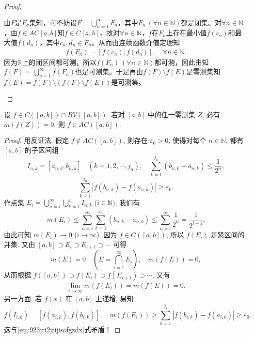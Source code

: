 \documentclass[../../main.tex]{subfiles}%
\begin{document}
\begin{proof}
\begin{enumerate}[(1)]
由$F$是$F_{\sigma}$集知，可不妨设$F=\bigcup\limits_{n=1}^{\infty}F_n$，其中$F_n\ (\forall n\in \mathbb{N})$都是闭集。对$\forall n\in \mathbb{N}$，由$f\in AC[a,b]$知$f\in C[a,b]$，故对$\forall n\in \mathbb{N}$，$f$在$F_n$上存在最小值$f(c_n)$和最大值$f(d_n)$，其中$c_n,d_n\in F_n$。从而由连续函数介值定理知
\begin{align*}
f(F_n)=\left[ f(c_n),f(d_n) \right],\quad \forall n\in \mathbb{N}.
\end{align*}
因为$\mathbb{R}$上的闭区间都可测，所以$f(F_n)\ (\forall n\in \mathbb{N})$都可测，因此由知$f(F)=\bigcup\limits_{n=1}^{\infty}f(F_n)$也是可测集。于是再由$f(F)\setminus f(E)$是零测集知$f(E)=f(F)\setminus (f(F)\setminus f(E))$是可测集。
\end{enumerate}
\end{proof}

\begin{example}
设 $f\in C([a,b])\cap  BV([a,b])$. 若对 $[a,b]$ 中的任一零测集 $Z$, 必有 $m(f(Z))=0$, 则 $f\in  AC([a,b])$.
\end{example}
\begin{proof}

用反证法. 假定 $f\notin  AC([a,b])$, 则存在 $\varepsilon_0>0$, 使得对每个 $n\in\mathbb{N}$, 都有 $[a,b]$ 的子区间组
\[
I_{n,k} = [a_{n,k}, b_{n,k}] \quad (k=1,2,\cdots,j_n), \quad \sum_{k=1}^{j_n} (b_{n,k} - a_{n,k}) \leqslant \frac{1}{2^n},
\]
\[
\sum_{k=1}^{j_n} |f(b_{n,k}) - f(a_{n,k})| \geqslant \varepsilon_0.
\]
作点集 $E_i = \bigcup_{n=i}^{\infty} \bigcup_{k=1}^{j_n} I_{n,k}$ ($i\in\mathbb{N}$), 我们有
\[
m(E_i) \leqslant \sum_{n=i}^{\infty} \sum_{k=1}^{j_n} (b_{n,k} - a_{n,k}) \leqslant \sum_{n=i}^{\infty} \frac{1}{2^n} = \frac{1}{2^{i-1}}.
\]
由此可知 $m(E_i)\to 0$ ($i\to\infty$). 因为 $f\in C([a,b])$, 所以 $f(E_i)$ 是紧区间的并集. 又由 $[a,b]\supset E_i\supset E_{i+1}\supset\cdots$ 可得
\[
m(E) = 0 \quad \left(E = \bigcap_{i=1}^{\infty} E_i\right), \quad m(f(E)) = 0,
\]
从而根据 $f([a,b])\supset f(E_i)\supset f(E_{i+1})\supset\cdots$, 又有
\begin{align}
\lim_{i\to\infty} m(f(E_i)) = m(f(E)) = 0. \label{eq::923jri2jrijisofgzdx}
\end{align}
另一方面, 若 $f(x)$ 在 $[a,b]$ 上递增, 易知
\[
f(I_{i,k}) = [f(a_{i,k}), f(b_{i,k})], \quad m(f(E_i)) \geqslant \sum_{k=1}^{j_i} |f(b_{i,k}) - f(a_{i,k})| \geqslant \varepsilon_0.
\]
这与\eqref{eq::923jri2jrijisofgzdx}式矛盾！

\end{proof}
\end{document}
